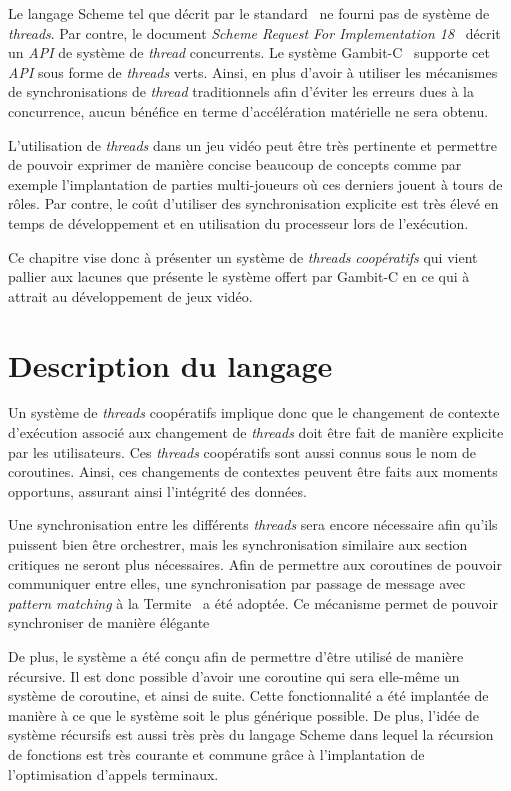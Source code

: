 \documentclass[12pt,oneside,letterpaper,francais]{book}
\begin{document}
Le langage Scheme tel que décrit par le standard~\cite{R5RS} ne fourni
pas de système de \textit{threads}. Par contre, le document
\textit{Scheme Request For Implementation 18}~\cite{SRFI18} décrit un
\textit{API} de système de \textit{thread} concurrents. Le système
Gambit-C~\cite{Gambit4} supporte cet \textit{API} sous forme de
\textit{threads} verts. Ainsi, en plus d'avoir à utiliser les
mécanismes de synchronisations de \textit{thread} traditionnels afin
d'éviter les erreurs dues à la concurrence, aucun bénéfice en terme
d'accélération matérielle ne sera obtenu.

L'utilisation de \textit{threads} dans un jeu vidéo peut être très
pertinente et permettre de pouvoir exprimer de manière concise
beaucoup de concepts comme par exemple l'implantation de parties
multi-joueurs où ces derniers jouent à tours de rôles. Par contre, le
coût d'utiliser des synchronisation explicite est très élevé en temps
de développement et en utilisation du processeur lors de l'exécution. 



Ce chapitre vise donc à présenter un système de \textit{threads}
\emph{coopératifs} qui vient pallier aux lacunes que présente le
système offert par Gambit-C en ce qui à attrait au développement de
jeux vidéo.



\section{Description du langage}

Un système de \textit{threads} coopératifs implique donc que le
changement de contexte d'exécution associé aux changement de
\textit{threads} doit être fait de manière explicite par les
utilisateurs. Ces \textit{threads} coopératifs sont aussi connus sous
le nom de coroutines. Ainsi, ces changements de contextes peuvent être
faits aux moments opportuns, assurant ainsi l'intégrité des données.

Une synchronisation entre les différents \textit{threads} sera encore
nécessaire afin qu'ils puissent bien être orchestrer, mais les
synchronisation similaire aux section critiques ne seront plus
nécessaires. Afin de permettre aux coroutines de pouvoir communiquer
entre elles, une synchronisation par passage de message avec
\textit{pattern matching} à la Termite~\cite{Termite_paper} a été
adoptée. Ce mécanisme permet de pouvoir synchroniser de manière
élégante

De plus, le système a été conçu afin de permettre d'être utilisé de
manière récursive. Il est donc possible d'avoir une coroutine qui sera
elle-même un système de coroutine, et ainsi de suite. Cette
fonctionnalité a été implantée de manière à ce que le système soit le
plus générique possible. De plus, l'idée de système récursifs est
aussi très près du langage Scheme dans lequel la récursion de
fonctions est très courante et commune grâce à l'implantation de
l'optimisation d'appels terminaux.
\end{document}
